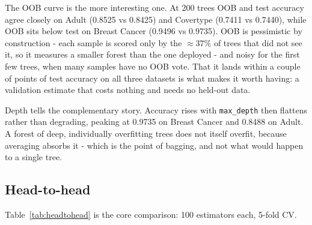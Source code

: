 \documentclass[conference]{IEEEtran}
\begin{document}
The OOB curve is the more interesting one.  At 200 trees OOB and test
accuracy agree closely on Adult (0.8525 vs 0.8425) and Covertype (0.7411 vs
0.7440), while OOB sits below test on Breast Cancer (0.9496 vs 0.9735).
OOB is pessimistic by construction - each sample is scored only by the
$\approx 37\%$ of trees that did not see it, so it measures a smaller
forest than the one deployed - and noisy for the first few trees, when
many samples have no OOB vote.  That it lands within a couple of points of
test accuracy on all three datasets is what makes it worth having: a
validation estimate that costs nothing and needs no held-out data.

Depth tells the complementary story.  Accuracy rises with
\texttt{max\_depth} then flattens rather than degrading, peaking at 0.9735
on Breast Cancer and 0.8488 on Adult.  A forest of deep, individually
overfitting trees does not itself overfit, because averaging absorbs it -
which is the point of bagging, and not what would happen to a single tree.

\subsection{Head-to-head}
Table~\ref{tab:headtohead} is the core comparison: 100 estimators each,
5-fold CV.
\end{document}
